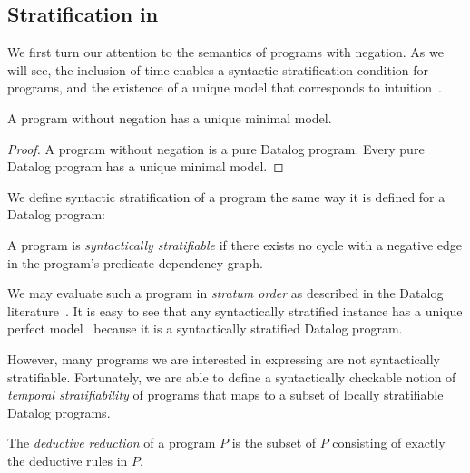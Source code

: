 
\subsection{Stratification in {\large{\bf\slang}}}
\label{sec:strat}
We first turn our attention to the semantics of programs with negation.  As we
will see, the inclusion of time enables a syntactic stratification condition
for programs, and the existence of a unique model that corresponds to
intuition~\cite{local-strat}.






\begin{lemma} \label{lemma:no-neg-unique}
A \slang program without negation 
has a unique minimal model.
\end{lemma}

\begin{proof} 
A \slang program without negation 
is a pure Datalog
program.  Every pure Datalog program has a unique minimal model. 
\end{proof}



We define syntactic stratification of a \slang program the same way it is
defined for a Datalog program:

\begin{definition}
A \slang program is \emph{syntactically stratifiable} if there
exists no cycle with a negative edge 
in the program's
predicate dependency graph.
\end{definition}


We may evaluate such a program in {\em stratum order} as described in the
Datalog literature~\cite{ullmanbook}.
It is easy to see that any syntactically stratified \slang instance has a
unique perfect model~\cite{local-strat} because it is a syntactically stratified Datalog program.




However, many programs we are interested in expressing are not syntactically
stratifiable.  Fortunately, we are able to define a syntactically checkable
notion of {\em temporal stratifiability} of \slang programs that maps to a
subset of locally stratifiable Datalog programs.








\begin{definition} 
The \emph{deductive reduction} of a \slang program $P$ is
the subset of $P$ consisting of exactly the deductive rules in $P$.
\end{definition}

